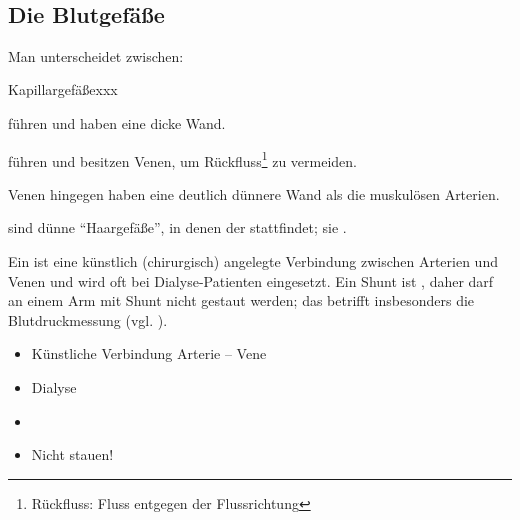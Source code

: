 \begin{gWideParEnv}
{


}
\end{gWideParEnv}

~




\subsection{Die Blutgefäße}

Man unterscheidet zwischen:

\begin{labeling}[\dots{}]{Kapillargefäßexxx}
    \item[\gT{Arterien}] führen  und haben eine dicke
    Wand. 
    \item[\gT{Venen}] führen  und
    besitzen Venen, um Rückfluss\footnote{Rückfluss:
    Fluss entgegen der Flussrichtung} zu vermeiden. 
    
    Venen
hingegen haben eine deutlich dünnere Wand als die
muskulösen Arterien.     
    \item[\gT{Kapillargefäße}] sind dünne "`Haargefäße"',
    in denen der  stattfindet; sie . 
\end{labeling}


{
\label{topic:shunt}
Ein    ist eine
künstlich (chirurgisch) angelegte Verbindung zwischen Arterien und
Venen und wird oft bei Dialyse-Patienten 
 eingesetzt. Ein Shunt ist , daher darf an
einem Arm mit Shunt nicht gestaut werden; das betrifft insbesonders die
Blutdruckmessung (vgl.
). 
}{
\begin{itemize}
  \item Künstliche Verbindung Arterie -- Vene
  \item Dialyse
  \item {}
  \item Nicht stauen!
\end{itemize}
}{}{}{}


